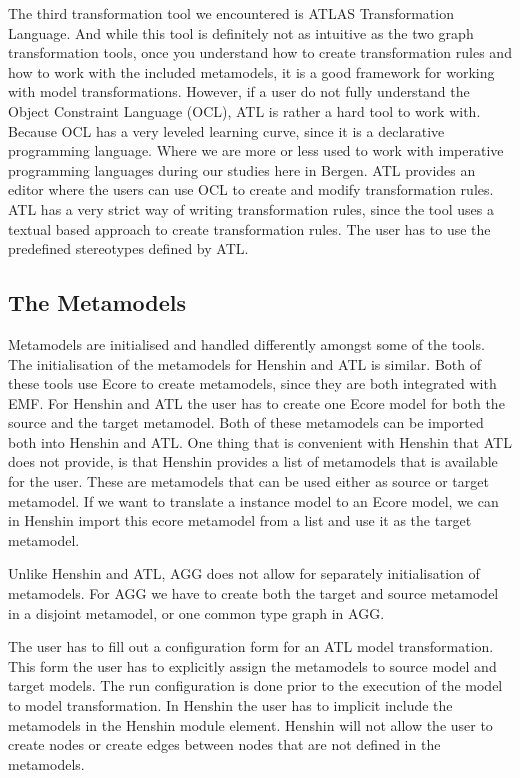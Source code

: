 \documentclass[pdftex,11pt,a4paper]{article}
\begin{document}
The third transformation tool we encountered is ATLAS Transformation Language.
And while this tool is definitely not as intuitive as the two graph
transformation tools, once you understand how to create transformation rules
and how to work with the included metamodels, it is a good framework for
working with model transformations. However, if a user do not fully understand
the Object Constraint Language (OCL), ATL is rather a hard tool to work with.
Because OCL has a very leveled learning curve, since it is a declarative
programming language. Where we are more or less used to work with imperative
programming languages during our studies here in Bergen. ATL provides an editor
where the users can use OCL to create and modify transformation rules. ATL has
a very strict way of writing transformation rules, since the tool uses a
textual based approach to create transformation rules. The user has to use the
predefined stereotypes defined by ATL.

\subsection{The Metamodels}
Metamodels are initialised and handled differently amongst some of the tools.
The initialisation of the metamodels for Henshin and ATL is similar. Both of
these tools use Ecore to create metamodels, since they are both integrated with
EMF. For Henshin and ATL the user has to create one Ecore model for both the
source and the target metamodel. Both of these metamodels can be imported both
into Henshin and ATL. One thing that is convenient with Henshin that ATL does
not provide, is that Henshin provides a list of metamodels that is available
for the user. These are metamodels that can be used either as source or target
metamodel. If we want to translate a instance model to an Ecore model, we can
in Henshin import this ecore metamodel from a list and use it as the target metamodel.

Unlike Henshin and ATL, AGG does not allow for separately initialisation of
metamodels. For AGG we have to create both the target and source metamodel in a
disjoint metamodel, or one common type graph in AGG.

The user has to fill out a configuration form for an ATL model transformation.
This form the user has to explicitly assign the metamodels to source model and
target models. The run configuration is done prior to the execution of the model
to model transformation. In Henshin the user has to implicit include the
metamodels in the Henshin module element. Henshin will not allow the user to
create nodes or create edges between nodes that are not defined in the
metamodels. 
\end{document}
